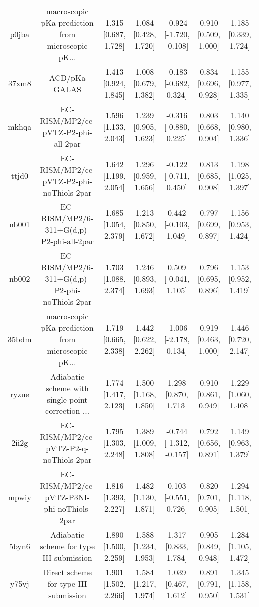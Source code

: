\documentclass{article}
\begin{document}
\begin{center}
\begin{longtable}{|ccccccc|}
 p0jba &  macroscopic pKa prediction from microscopic pK... &  1.315 [0.687, 1.728] &  1.084 [0.428, 1.720] &  -0.924 [-1.720, -0.108] &  0.910 [0.509, 1.000] &   1.185 [0.339, 1.724] \\
 37xm8 &                                      ACD/pKa GALAS &  1.413 [0.924, 1.845] &  1.008 [0.679, 1.382] &   -0.183 [-0.682, 0.324] &  0.834 [0.696, 0.928] &   1.155 [0.977, 1.335] \\
 mkhqa &                EC-RISM/MP2/cc-pVTZ-P2-phi-all-2par &  1.596 [1.133, 2.043] &  1.239 [0.905, 1.623] &   -0.316 [-0.880, 0.225] &  0.803 [0.668, 0.904] &   1.140 [0.980, 1.336] \\
 ttjd0 &           EC-RISM/MP2/cc-pVTZ-P2-phi-noThiols-2par &  1.642 [1.199, 2.054] &  1.296 [0.959, 1.656] &   -0.122 [-0.711, 0.450] &  0.813 [0.685, 0.908] &   1.198 [1.025, 1.397] \\
 nb001 &           EC-RISM/MP2/6-311+G(d,p)-P2-phi-all-2par &  1.685 [1.054, 2.379] &  1.213 [0.850, 1.672] &    0.442 [-0.103, 1.049] &  0.797 [0.699, 0.897] &   1.156 [0.953, 1.424] \\
 nb002 &      EC-RISM/MP2/6-311+G(d,p)-P2-phi-noThiols-2par &  1.703 [1.088, 2.374] &  1.246 [0.893, 1.693] &    0.509 [-0.041, 1.105] &  0.796 [0.695, 0.896] &   1.153 [0.952, 1.419] \\
 35bdm &  macroscopic pKa prediction from microscopic pK... &  1.719 [0.665, 2.338] &  1.442 [0.622, 2.262] &   -1.006 [-2.178, 0.134] &  0.919 [0.463, 1.000] &   1.446 [0.720, 2.147] \\
 ryzue &  Adiabatic scheme with single point correction ... &  1.774 [1.417, 2.123] &  1.500 [1.168, 1.850] &     1.298 [0.870, 1.713] &  0.910 [0.861, 0.949] &   1.229 [1.060, 1.408] \\
 2ii2g &             EC-RISM/MP2/cc-pVTZ-P2-q-noThiols-2par &  1.795 [1.303, 2.248] &  1.389 [1.009, 1.808] &  -0.744 [-1.312, -0.157] &  0.792 [0.656, 0.891] &   1.149 [0.963, 1.379] \\
 mpwiy &         EC-RISM/MP2/cc-pVTZ-P3NI-phi-noThiols-2par &  1.816 [1.393, 2.227] &  1.482 [1.130, 1.871] &    0.103 [-0.551, 0.726] &  0.820 [0.701, 0.905] &   1.294 [1.118, 1.501] \\
 5byn6 &           Adiabatic scheme for type III submission &  1.890 [1.500, 2.259] &  1.588 [1.234, 1.953] &     1.317 [0.833, 1.784] &  0.905 [0.849, 0.948] &   1.284 [1.105, 1.472] \\
 y75vj &              Direct scheme for type III submission &  1.901 [1.502, 2.266] &  1.584 [1.217, 1.974] &     1.039 [0.467, 1.612] &  0.891 [0.791, 0.950] &   1.345 [1.158, 1.531] \\

\end{longtable}
\end{center}
\end{document}
